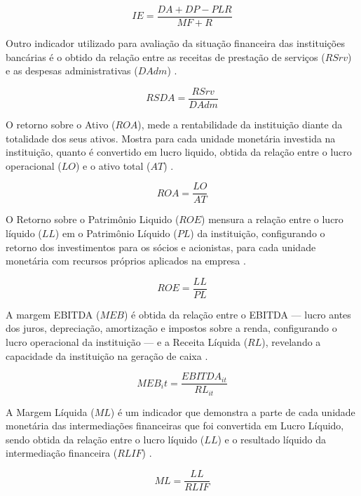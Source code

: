 \documentclass[
  12pt,
  12pt,
  openright,
  oneside,
  a4paper,
  chapter=TITLE,
  section=TITLE,
  subsection=TITLE,
  subsubsection=TITLE,
  portugues,
  sumario=tradicional]{abntex2}
\begin{document}
\begin{equation}
IE = \frac{DA + DP - PLR}{MF + R} 
\end{equation}

Outro indicador utilizado para avaliação da situação financeira das instituições bancárias é o obtido da relação entre as receitas de prestação de serviços (\(RSrv\)) e as despesas administrativas (\(DAdm\)) \cite{dantas:2012}.

\begin{equation}
RSDA = \frac{RSrv_{}}{DAdm{}}
\end{equation}

O retorno sobre o Ativo (\(ROA\)), mede a rentabilidade da instituição diante da totalidade dos seus ativos. Mostra para cada unidade monetária investida na instituição, quanto é convertido em lucro liquido, obtida da relação entre o lucro operacional (\(LO\)) e o ativo total (\(AT\)) \cite{assaf:2020}.

\begin{equation}
ROA = \frac{LO}{AT}
\end{equation}

O Retorno sobre o Patrimônio Liquido (\(ROE\)) mensura a relação entre o lucro líquido (\(LL\)) em o Patrimônio Líquido (\(PL\)) da instituição, configurando o retorno dos investimentos para os sócios e acionistas, para cada unidade monetária com recursos próprios aplicados na empresa \cite{assaf:2020}.

\begin{equation}
ROE = \frac{LL}{PL}
\end{equation}

A margem EBITDA (\(MEB\)) é obtida da relação entre o EBITDA --- lucro antes dos juros, depreciação, amortização e impostos sobre a renda, configurando o lucro operacional da instituição --- e a Receita Líquida (\(RL\)), revelando a capacidade da instituição na geração de caixa \cite{assaf:2020}.

\begin{equation}
MEB_it = \frac{EBITDA_{it}}{RL_{it}}
\end{equation}

A Margem Líquida (\(ML\)) é um indicador que demonstra a parte de cada unidade monetária das intermediações financeiras que foi convertida em Lucro Líquido, sendo obtida da relação entre o lucro líquido (\(LL\)) e o resultado líquido da intermediação financeira (\(RLIF\)) \cite{assaf:2020}.

\begin{equation}
ML = \frac{LL}{RLIF}
\end{equation}
\end{document}
